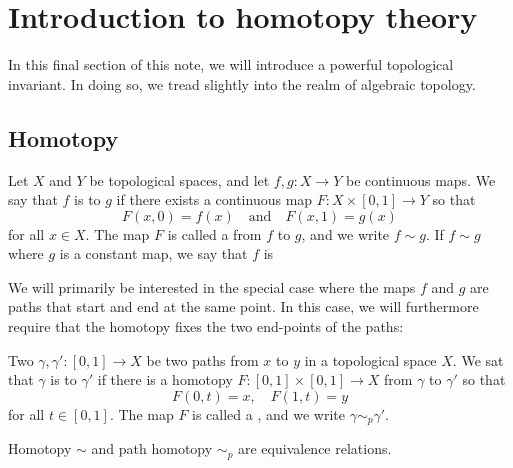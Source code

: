 \section{Introduction to homotopy theory}
\label{homotopy}
In this final section of this note, we will introduce a powerful topological invariant. In doing so, we tread slightly into the realm of algebraic topology.

\subsection{Homotopy}
\begin{defn}
  Let $X$ and $Y$ be topological spaces, and let $f, g : X \to Y$ be continuous maps. We say that $f$ is  to $g$ if there exists a continuous map $F : X \times [0,1] \to Y$ so that
  \[
    F(x,0) = f(x) \quad \text{and} \quad F(x,1) = g(x)
  \]
  for all $x \in X$. The map $F$ is called a  from $f$ to $g$, and we write $f \sim g$. If $f \sim g$ where $g$ is a constant map, we say that $f$ is 
\end{defn}
We will primarily be interested in the special case where the maps $f$ and $g$ are paths that start and end at the same point. In this case, we will furthermore require that the homotopy fixes the two end-points of the paths:
\begin{defn}
  Two $\gamma, \gamma' : [0,1] \to X$ be two paths from $x$ to $y$ in a topological space $X$. We sat that $\gamma$ is  to $\gamma'$ if there is a homotopy $F: [0,1] \times [0,1] \to X$ from $\gamma$ to $\gamma'$ so that
  \[
    F(0,t) = x, \quad F(1,t) = y
  \]
  for all $t \in [0,1]$. The map $F$ is called a , and we write $\gamma \sim_p \gamma'$.
\end{defn}
\begin{lem}
  Homotopy $\sim$ and path homotopy $\sim_p$ are equivalence relations.
\end{lem}
